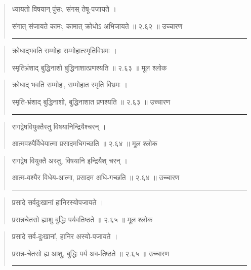 \begin{quotation}

ध्यायतो विषयान् पुंसः, संगस् तेषू-पजायते  ।  

संगात् संजायते कामः, कामात् क्रोधोऽ अभिजायते  ॥ २.६२ ॥  उच्चारण

\noindent\rule{16cm}{0.4pt} 
\end{quotation}


\begin{quotation}

क्रोधाद्‍भवति सम्मोहः सम्मोहात्स्मृतिविभ्रमः  ।  

स्मृतिभ्रंशाद् बुद्धिनाशो बुद्धिनाशात्प्रणश्यति  ॥ २.६३ ॥  मूल श्लोक
\end{quotation}

\begin{quotation}

क्रोधाद्‍ भवति सम्मोहः, सम्मोहात स्मृति विभ्रमः  ।  

स्मृति-भ्रंशाद् बुद्धिनाशो, बुद्धिनाशात प्रणश्यति  ॥ २.६३ ॥  उच्चारण

\noindent\rule{16cm}{0.4pt} 
\end{quotation}


\begin{quotation}
रागद्वेषवियुक्तैस्तु विषयानिन्द्रियैश्चरन्‌  ।  

आत्मवश्यैर्विधेयात्मा प्रसादमधिगच्छति  ॥ २.६४ ॥  मूल श्लोक
\end{quotation}

\begin{quotation}

रागद्वेष वियुक्तै अस्तु, विषयानि इन्द्रियैश् चरन्‌  ।  

आत्म-वश्यैर विधेय-आत्मा, प्रसादम अधि-गच्छति  ॥ २.६४ ॥  उच्चारण

\noindent\rule{16cm}{0.4pt} 
\end{quotation}


\begin{quotation}

प्रसादे सर्वदुःखानां हानिरस्योपजायते  ।  

प्रसन्नचेतसो ह्याशु बुद्धिः पर्यवतिष्ठते  ॥ २.६५ ॥  मूल श्लोक
\end{quotation}

\begin{quotation}

प्रसादे सर्व-दुःखानां, हानिर अस्यो-पजायते  ।  

प्रसन्न-चेतसो ह्य आशु, बुद्धिः पर्य अव-तिष्ठते  ॥ २.६५ ॥  उच्चारण

\noindent\rule{16cm}{0.4pt} 
\end{quotation}


